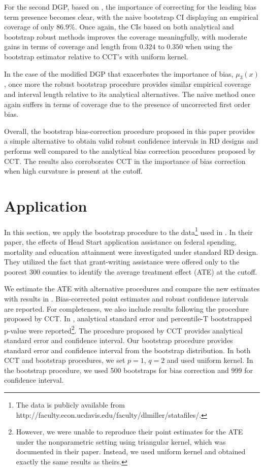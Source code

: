 \documentclass[12pt,fleqn]{article}
\begin{document}
For the second DGP, based on \cite{ludwig2007}, the importance of correcting for the leading bias term presence becomes clear, with the naive bootstrap CI displaying an empirical coverage of only 86.9\%. Once again, the CIs based on both analytical and bootstrap robust methods improves the coverage meaningfully, with moderate gains in terms of coverage and length from $0.324$ to $0.350$ when using the bootstrap estimator relative to CCT's with uniform kernel.

In the case of the modified \cite{lee2008rand} DGP that exacerbates the importance of bias, $\mu_{3}(x)$, once more the robust bootstrap procedure provides similar empirical coverage and interval length relative to its analytical alternatives. The naive method once again suffers in terms of coverage due to the presence of uncorrected first order bias.

 Overall, the bootstrap bias-correction procedure proposed in this paper provides a simple alternative to obtain valid robust confidence intervals in RD designs and performs well compared to the analytical
bias correction procedures proposed by CCT. The results also corroborates CCT in the importance of bias correction when high curvature is present at the cutoff. 

\section{Application}\label{application}

In this section, we apply the bootstrap procedure to the data\footnote{The data is publicly available from http://faculty.econ.ucdavis.edu/faculty/dlmiller/statafiles/.} used in \cite{ludwig2007}. In their paper, the effects of Head Start application assistance on federal spending, mortality and education attainment were investigated under standard RD design. They utilized the fact that grant-writing assistance were offered only to the poorest 300 counties to identify the average treatment effect (ATE) at the cutoff.

We estimate the ATE with alternative procedures and compare the new estimates with results in \cite{ludwig2007}. Bias-corrected point estimates and robust confidence intervals are reported. For completeness, we also include results following the procedure proposed by CCT. In \cite{ludwig2007}, analytical standard error and percentile-T bootstrapped p-value were reported\footnote{However, we were unable to reproduce their point estimates for the ATE under the nonparametric setting using triangular kernel, which was documented in their paper. Instead, we used uniform kernel and obtained exactly the same results as theirs.}. The procedure proposed by CCT provides analytical standard error and confidence interval. Our bootstrap procedure provides standard error and confidence interval from the bootstrap distribution. In both CCT and bootstrap procedures, we set $p = 1$, $q = 2$ and used uniform kernel. In the bootstrap procedure, we used 500 bootstraps for bias correction and 999 for confidence interval.
\end{document}
